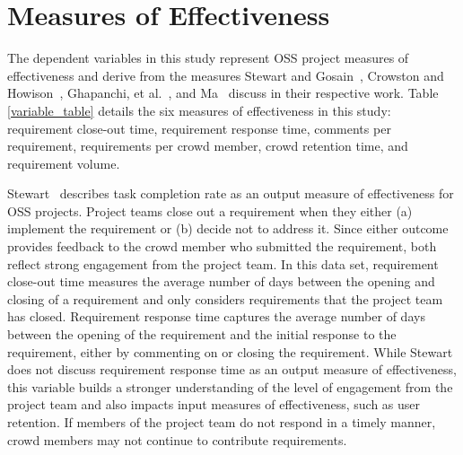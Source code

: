 \section{Measures of Effectiveness}
\label{measures_of_effectiveness}

The dependent variables in this study represent OSS project measures of effectiveness and derive from the measures Stewart and Gosain~\cite{stewart}, Crowston and Howison~\cite{crowston}, Ghapanchi, et al.~\cite{ghapanchi}, and Ma~\cite{ma} discuss in their respective work. Table \ref{variable_table} details the six measures of effectiveness in this study: requirement close-out time, requirement response time, comments per requirement, requirements per crowd member, crowd retention time, and requirement volume. 

Stewart~\cite{stewart} describes task completion rate as an output measure of effectiveness for OSS projects. Project teams close out a requirement when they either (a) implement the requirement or (b) decide not to address it. Since either outcome provides feedback to the crowd member who submitted the requirement, both reflect strong engagement from the project team. In this data set, requirement close-out time measures the average number of days between the opening and closing of a requirement and only considers requirements that the project team has closed. Requirement response time captures the average number of days between the opening of the requirement and the initial response to the requirement, either by commenting on or closing the requirement. While Stewart~\cite{stewart} does not discuss requirement response time as an output measure of effectiveness, this variable builds a stronger understanding of the level of engagement from the project team and also impacts input measures of effectiveness, such as user retention. If members of the project team do not respond in a timely manner, crowd members may not continue to contribute requirements.

